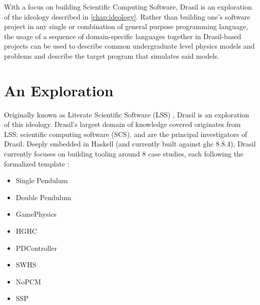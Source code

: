 With a focus on building Scientific Computing Software,
Drasil\thinspace\cite{Drasil2021} is an exploration of the ideology described in
\autoref{chap:ideology}. Rather than building one's software project in any
single or combination of general purpose programming language, the usage of a
sequence of domain-specific languages together in Drasil-based projects can be
used to describe common undergraduate level physics models and problems and
describe the target program that simulates said models.


\section{An Exploration}

Originally known as Literate Scientific Software (LSS) , Drasil is an
exploration of this ideology. Drasil's largest domain of knowledge covered
originates from LSS: scientific computing software (SCS).  and  are the principal investigators of
Drasil. Deeply embedded in Haskell  (and currently built against
\acs{ghc}  8.8.4), Drasil currently focuses on building tooling around
8 case studies, each following the formalized  template
\cite{SmithAndLai2005}:

\begin{itemize}

      \item Single Pendulum

      \item Double Pendulum

      \item GamePhysics

      \item HGHC

      \item PDController

      \item SWHS

      \item NoPCM

      \item SSP

\end{itemize}

